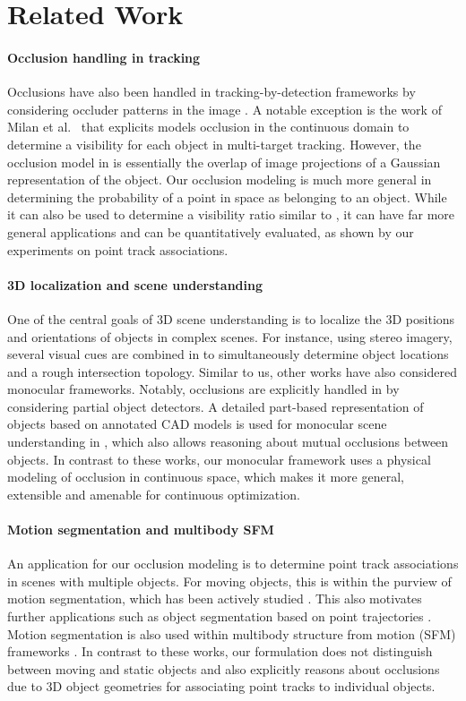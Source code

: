 \section{Related Work}
\paragraph{Occlusion handling in tracking}
Occlusions have also been handled in tracking-by-detection frameworks by considering occluder patterns in the image \cite{Kwak_etal_2012,Wu_Nevatia_2007}. A notable exception is the work of Milan et al.~\cite{Milan_etal_2014} that explicits models occlusion in the continuous domain to determine a visibility for each object in multi-target tracking. However, the occlusion model in \cite{Milan_etal_2014} is essentially the overlap of image projections of a Gaussian representation of the object. Our occlusion modeling is much more general in determining the probability of a point in space as belonging to an object. While it can also be used to determine a visibility ratio similar to \cite{Milan_etal_2014}, it can have far more general applications and can be quantitatively evaluated, as shown by our experiments on point track associations.

\paragraph{3D localization and scene understanding}
One of the central goals of 3D scene understanding is to localize the 3D positions and orientations of objects in complex scenes. For instance, using stereo imagery, several visual cues are combined in \cite{Geiger_etal_2014} to simultaneously determine object locations and a rough intersection topology. Similar to us, other works have also considered monocular frameworks. Notably, occlusions are explicitly handled in \cite{Wojek_etal_2013} by considering partial object detectors. A detailed part-based representation of objects based on annotated CAD models is used for monocular scene understanding in \cite{Zia_etal_2013,Zia_etal_2014}, which also allows reasoning about mutual occlusions between objects. In contrast to these works, our monocular framework uses a physical modeling of occlusion in continuous space, which makes it more general, extensible and amenable for continuous optimization.

\paragraph{Motion segmentation and multibody SFM}
An application for our occlusion modeling is to determine point track associations in scenes with multiple objects. For moving objects, this is within the purview of motion segmentation, which has been actively studied \cite{Tron_Vidal_2007,Rao_etal_2010}. This also motivates further applications such as object segmentation based on point trajectories \cite{Brox_Malik_2010}. Motion segmentation is also used within multibody structure from motion (SFM) frameworks \cite{Ozden_etal_2010,Kundu_etal_2011,Namdev2012}. In contrast to these works, our formulation does not distinguish between moving and static objects and also explicitly reasons about occlusions due to 3D object geometries for associating point tracks to individual objects.
